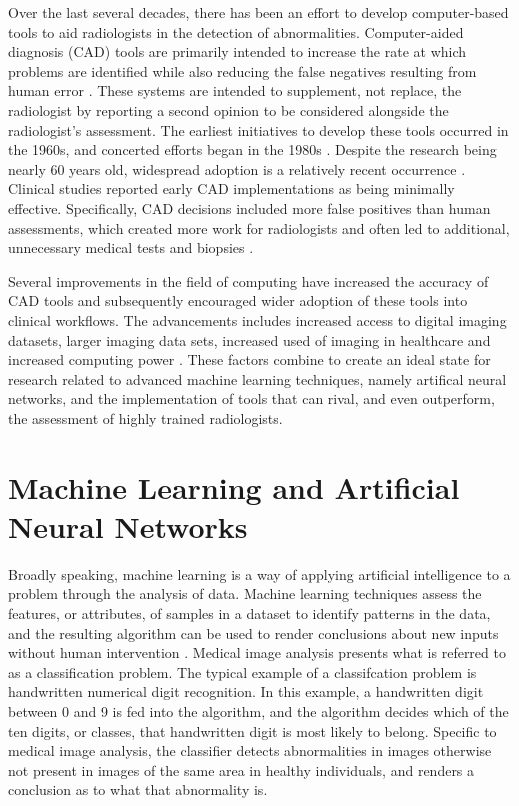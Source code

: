\documentclass[sigconf]{acmart}
\begin{document}
Over the last several decades, there has been an effort to develop computer-based tools to aid radiologists in the detection of abnormalities. Computer-aided diagnosis (CAD) tools are primarily intended to increase the rate at which problems are identified while also reducing the false negatives resulting from human error \cite{cite06} . These systems are intended to supplement, not replace, the radiologist by reporting a second opinion to be considered alongside the radiologist's assessment. The earliest initiatives to develop these tools occurred in the 1960s, and concerted efforts began in the 1980s \cite{cite02}. Despite the research being nearly 60 years old, widespread adoption is a relatively recent occurrence \cite{cite03}. Clinical studies reported early CAD implementations as being minimally effective. Specifically, CAD decisions included more false positives than human assessments, which created more work for radiologists and often led to additional, unnecessary medical tests and biopsies \cite{cite05}.

Several improvements in the field of computing have increased the accuracy of CAD tools and subsequently encouraged wider adoption of these tools into clinical workflows. The advancements includes increased access to digital imaging datasets, larger imaging data sets, increased used of imaging in healthcare and increased computing power \cite{cite03}\cite{cite05}. These factors combine to create an ideal state for research related to advanced machine learning techniques, namely artifical neural networks, and the implementation of tools that can rival, and even outperform, the assessment of highly trained radiologists.

\section{Machine Learning and Artificial Neural Networks}

Broadly speaking, machine learning is a way of applying artificial intelligence to a problem through the analysis of data. Machine learning techniques assess the features, or attributes, of samples in a dataset to identify patterns in the data, and the resulting algorithm can be used to render conclusions about new inputs without human intervention \cite{cite05}. Medical image analysis presents what is referred to as a classification problem. The typical example of a classifcation problem is handwritten numerical digit recognition. In this example, a handwritten digit between 0 and 9 is fed into the algorithm, and the algorithm decides which of the ten digits, or classes, that handwritten digit is most likely to belong. Specific to medical image analysis, the classifier detects abnormalities in images otherwise not present in images of the same area in healthy individuals, and renders a conclusion as to what that abnormality is.
\end{document}
